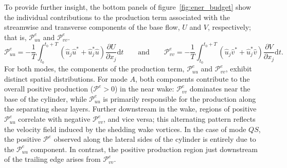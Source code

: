 To provide further insight, the bottom panels of figure~\ref{fig:ener_budget} show the individual contributions to the production term associated with the streamwise and transverse components of the base flow, $U$ and $V$, respectively; that is, $\mathcal{P}_{uu}^e$ and $\mathcal{P}_{vv}^e$.
%
\begin{equation}
  \mathcal{P}_{uu}^e = - \frac{1}{T} \int_{t_0}^{t_0+T} \left( \hat{u}_j \hat{u}^* + \hat{u}_j^* \hat{u} \right) \frac{\partial U}{\partial x_j} \text{d} t \qquad \text{and} \qquad
\mathcal{P}_{vv}^e = - \frac{1}{T} \int_{t_0}^{t_0+T} \left( \hat{u}_j \hat{v}^* + \hat{u}_j^* \hat{v} \right) \frac{\partial V}{\partial x_j} \text{d} t.
\end{equation}
%
For both modes, the components of the production term, $\mathcal{P}_{uu}^e$ and $\mathcal{P}_{vv}^e$, exhibit distinct spatial distributions. For mode $A$, both components contribute to the overall positive production ($\mathcal{P}^e > 0$) in the near wake: $\mathcal{P}_{vv}^e$ dominates near the base of the cylinder, while $\mathcal{P}_{uu}^e$ is primarily responsible for the production along the separating shear layers. Further downstream in the wake, regions of positive $\mathcal{P}_{uu}^e$ correlate with negative $\mathcal{P}_{vv}^e$, and vice versa; this alternating pattern reflects the velocity field induced by the shedding wake vortices.
%
In the case of mode $QS$, the positive $\mathcal{P}^e$ observed along the lateral sides of the cylinder is entirely due to the $\mathcal{P}_{uu}^e$ component. In contrast, the positive production region just downstream of the trailing edge arises from $\mathcal{P}_{vv}^e$.

